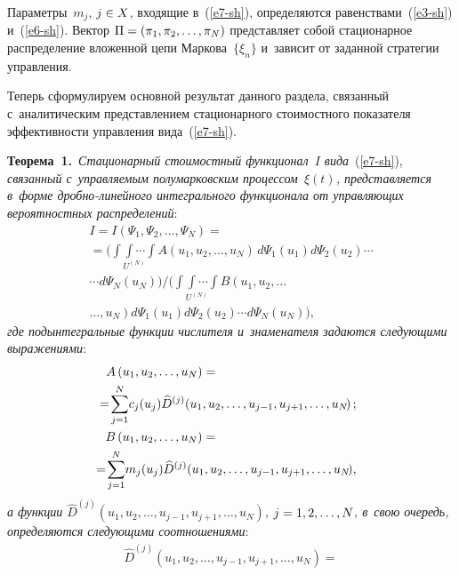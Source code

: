 \begin{multicols}{2}
Па\-ра\-мет\-ры~$m_j$, $j\hm\in X$, входящие в~(\ref{e7-sh}), определяются равенствами~(\ref{e3-sh}) и~(\ref{e6-sh}). 
Вектор $\Pi\hm=(\pi_1,\pi_2,\dots,\pi_N)$ пред\-став\-ля\-ет собой стационарное 
распределение вложенной цепи Маркова~$\{\xi_n\}$ и~зависит от заданной стратегии 
управления.

Теперь сформулируем основной результат данного раздела, связанный 
с~аналитическим пред\-став\-ле\-ни\-ем стационарного стоимостного показателя эф\-фек\-тив\-ности 
управ\-ле\-ния вида~(\ref{e7-sh}).

\smallskip

\noindent
\textbf{Теорема~1.}\
\textit{Стационарный стоимостный функционал~$I$ вида}~(\ref{e7-sh}), \textit{связанный с~управ\-ля\-емым 
полумарковским процессом~$\xi(t)$, пред\-став\-ля\-ет\-ся в~форме дроб\-но-ли\-ней\-но\-го 
интегрального функционала от \mbox{управля\-ющих} вероятностных распределений}:
\begin{multline}
I=I\left(\Psi_1,\Psi_2,\ldots ,\Psi_N\right)={}\\
{}=
\Bigg(\underset{U^{(N)}}{\int\!\!\!\int\cdots\!\int }
A(u_1,u_2,\ldots ,u_N)\,d\Psi_1(u_1)d\Psi_2(u_2)\cdots\\
\cdots d\Psi_N(u_N)\Bigg)\!\Bigg/\!
\Bigg(\underset{U^{(N)}}{\int\!\!\!\int\cdots
\int }B\left(u_1,u_2,\ldots \right.\\
\left.\ldots ,u_N\right)d\Psi_1(u_1)d\Psi_2(u_2)\cdots d\Psi_N(u_N)\Bigg),
\label{e9-sh}
\end{multline}
\textit{где подынтегральные функции числителя и~знаменателя задаются сле\-ду\-ющи\-ми 
выражениями}:
\begin{align}
A\left(u_1,u_2,\ldots ,u_N\right)&={}\notag\\
&\hspace*{-30mm}{}=\!\sum\limits_{j=1}^{N} \!
c_j(u_j)\widehat{D}^{(j)}\!\left(u_1,u_2,\ldots,u_{j-1},u_{j+1},\ldots ,u_N\!\right);
\label{e10-sh}
\\
B\left(u_1,u_2,\ldots ,u_N\right)&={}\notag\\
&\hspace*{-31mm}{}=\!\sum\limits_{j=1}^{N} \!
m_j(u_j)\widehat{D}^{(j)}\!\left(u_1,u_2,\ldots ,u_{j-1},u_{j+1},\ldots ,u_N\!\right)\!,
\label{e11-sh}
\end{align}
\textit{а функции $\widehat{D}^{(j)}(u_1,u_2,\ldots ,u_{j-1},u_{j+1},\ldots ,u_N)$, 
$j\hm=1,2,\ldots ,N$, в~свою очередь, определяются сле\-ду\-ющи\-ми соотношениями}:
\begin{multline}
\widehat{D}^{(j)}\left(u_{1},u_{2},\ldots ,u_{j-1},u_{j+1},\ldots,u_{N}\right)={}\\

\end{multline}
\end{multicols}
